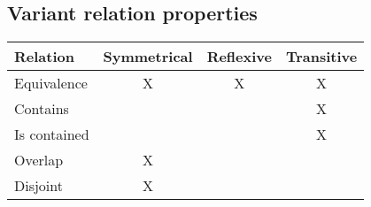\subsection*{Variant relation properties}
%
\begin{table}[h!]
    \begin{tabular}{|l|c|c|c|}
        \hline
        \textbf{Relation} & \textbf{Symmetrical} & \textbf{Reflexive} & \textbf{Transitive} \\
        \hline
        Equivalence       & X                    & X                  & X \\
        \hline 
        Contains          &                      &                    & X \\
        \hline 
        Is contained      &                      &                    & X \\
        \hline 
        Overlap           & X                    &                    &   \\
        \hline 
        Disjoint          & X                    &                    &   \\
        \hline
    \end{tabular}
\end{table}